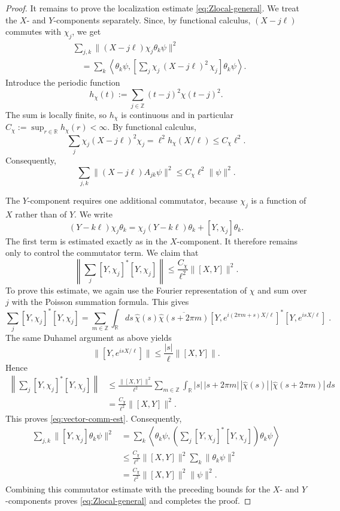 \documentclass[10pt,a4paper]{amsart}
\newcommand{\R}{\mathbb R}
\newcommand{\Z}{\mathbb Z}
\begin{document}
\begin{proof}
It remains to prove the localization estimate \eqref{eq:Zlocal-general}. We treat the $X$- and $Y$-components separately.
Since, by functional calculus, $(X-j\ell)$ commutes with $\chi_j$, we get 
\begin{align*}
 &\sum_{j,k}\|(X-j\ell)\chi_j\theta_k\psi\|^2\\
 &\quad=
 \sum_k
 \left\langle
 \theta_k\psi,
 \left[
 \sum_j\chi_j\,(X-j\ell)^2\,\chi_j
 \right]
 \theta_k\psi
 \right\rangle.
\end{align*}
Introduce the periodic function
\[
 h_\chi(t):=
 \sum_{j\in\mathbb Z}(t-j)^2\chi(t-j)^2 .
\]
The sum is locally finite, so \(h_\chi\) is continuous and in particular
\(
 C_\chi:=\sup_{r\in\mathbb R}h_\chi(r)<\infty.
\)
By functional calculus,
\[
 \sum_j\chi_j(X-j\ell)^2\chi_j
 =
 \ell^2h_\chi(X/\ell)
 \le C_\chi\ell^2.
\]
Consequently,
\begin{equation*}
 \sum_{j,k}\|(X-j\ell)A_{jk}\psi\|^2
 \le 
 C_\chi\ell^2\|\psi\|^2.
 \label{eq:X-local-piece}
\end{equation*}

The $Y$-component requires one additional commutator, because $\chi_j$ is a function of $X$ rather than of $Y$. We write
\[
 (Y-k\ell)\chi_j\theta_k
 =
 \chi_j(Y-k\ell)\theta_k+[Y,\chi_j]\theta_k.
\]
The first term is estimated exactly as in the $X$-component. It therefore remains only to control the commutator term. We claim that
\begin{equation}\label{eq:vector-comm-est}
 \left\|\sum_j[Y,\chi_j]^*[Y,\chi_j]\right\|
 \le \frac{C_\chi}{\ell^2}\|[X,Y]\|^2.
\end{equation}
To prove this estimate, we again use the Fourier representation of $\chi$ and sum over $j$ with the Poisson summation formula. This gives
\[
 \sum_j[Y,\chi_j]^*[Y,\chi_j] = \sum_{m \in \Z}\int_{\R}ds\,\hat{\chi}(s)\overline{\hat{\chi}(s + 2\pi m)}\left[Y, e^{i(2\pi m + s) X/\ell}\right]^* \left[Y, e^{i s X/ \ell}\right]\;.
\]
The same Duhamel argument as above yields
\[
 \|\left[Y,e^{isX/\ell}\right]\|
 \le \frac{|s|}{\ell}\|[X,Y]\|.
\]
Hence
\begin{align*}
 \left\|\sum_j[Y,\chi_j]^*[Y,\chi_j]\right\|
 &\le \frac{\|[X,Y]\|^2}{\ell^2}
 \sum_{m\in\Z}\int_{\R}
 |s|\,| s +2\pi m|\,
 |\widehat\chi(s)|\,|\widehat\chi(s + 2\pi m )|\,ds\\
 &=\frac{C_\chi}{\ell^2}\|[X,Y]\|^2.
\end{align*}
This proves \eqref{eq:vector-comm-est}. Consequently,
\begin{align*}
 \sum_{j,k}\|[Y,\chi_j]\theta_k\psi\|^2
 &=
 \sum_k
 \left\langle
 \theta_k\psi,
 \left(\sum_j[Y,\chi_j]^*[Y,\chi_j]\right)
 \theta_k\psi
 \right\rangle\\
 &\le
 \frac{C_\chi}{\ell^2}\|[X,Y]\|^2
 \sum_k\|\theta_k\psi\|^2\\
 &=
 \frac{C_\chi}{\ell^2}\|[X,Y]\|^2\|\psi\|^2.
\end{align*}
Combining this commutator estimate with the preceding bounds for the $X$- and $Y$-components proves \eqref{eq:Zlocal-general} and completes the proof.
\end{proof}
\end{document}
